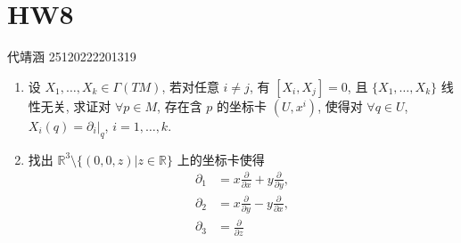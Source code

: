 \documentclass[../main.tex]{subfiles}
\begin{document}
\ifSubfilesClassLoaded{

    
    \setcounter{chapter}{7}
}{}

\chapter{ HW8 }
 代靖涵 25120222201319

\begin{exercise}{}{}
\begin{enumerate}
\item 设 $X_1, \dots, X_k \in \Gamma(TM)$, 若对任意 $i \neq j$, 有 $[X_i, X_j] = 0$, 且 $\{X_1, \dots, X_k\}$ 线性无关, 求证对 $\forall p \in M$, 存在含 $p$ 的坐标卡 $(U, x^i)$, 使得对 $\forall q \in U$, $X_i(q) = \partial_i|_q$, $i=1, \dots, k$.

\item 找出 $\mathbb{R}^3 \setminus \{(0,0,z)|z \in \mathbb{R}\}$ 上的坐标卡使得
\[\begin{aligned}
\partial_1 &= x\frac{\partial}{\partial x} + y\frac{\partial}{\partial y}, \\
\partial_2 &= x\frac{\partial}{\partial y} - y\frac{\partial}{\partial x}, \\
\partial_3 &= \frac{\partial}{\partial z}
\end{aligned}\]

\end{enumerate}
\end{exercise}
\end{document}
